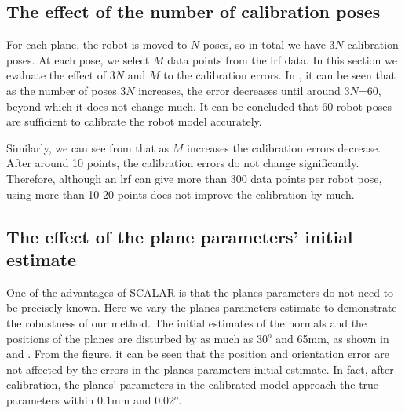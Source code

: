 \subsection{The effect of the number of calibration poses}
\label{sec:calib_poses}
For each plane, the robot is moved to $N$ poses, so in total we have $3N$ calibration poses. At each pose, we select $M$ data points from the \ac{lrf} data. In this section we evaluate the effect of $3N$ and $M$ to the calibration errors. In , it can be seen that as the number of poses $3N$ increases, the error decreases until around $3N$=60, beyond which it does not change much. It can be concluded that 60 robot poses are sufficient to calibrate the robot model accurately. 


Similarly, we can see from  that as $M$ increases the calibration errors decrease. After around 10 points, the calibration errors do not change significantly. Therefore, although an \ac{lrf} can give more than 300 data points per robot pose, using more than 10-20 points does not improve the calibration by much. 



\subsection{The effect of the plane parameters' initial estimate}
\label{sec:plane_params}
One of the advantages of SCALAR is that the planes parameters do not need to be precisely known. Here we vary the planes parameters estimate to demonstrate the robustness of our method. The initial estimates of the normals and the positions of the planes are disturbed by as much as 30$^o$ and 65mm, as shown in  and . From the figure, it can be seen that the position and orientation error are not affected by the errors in the planes parameters initial estimate. In fact, after calibration, the planes' parameters in the calibrated model approach the true parameters within 0.1mm and 0.02$^o$.





